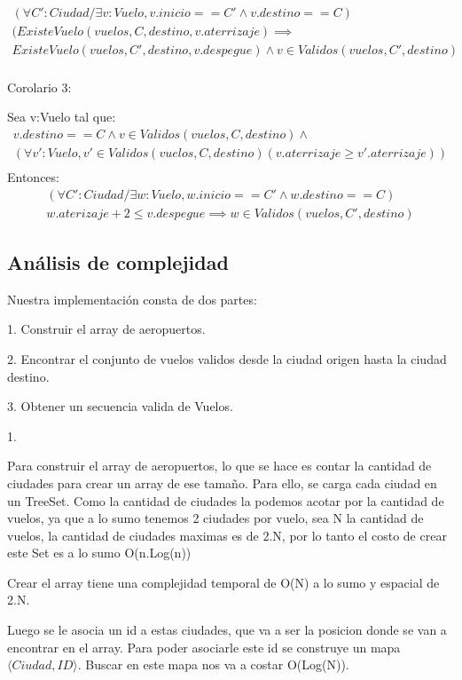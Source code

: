 \begin{align*}
(\forall C':Ciudad / \exists v:Vuelo, v.inicio == C' \wedge v.destino == C)\\
(ExisteVuelo(vuelos,C,destino,v.aterrizaje) \implies \\
ExisteVuelo(vuelos,C',destino,v.despegue) \wedge v \in Validos(vuelos,C',destino)
\end{align*}
\begin{align*}
\end{align*}


Corolario 3:

Sea v:Vuelo tal que:
\begin{align*}
v.destino == C \wedge v \in Validos(vuelos,C,destino) \wedge\\
(\forall v':Vuelo, v' \in Validos(vuelos,C,destino)(v.aterrizaje \geq v'.aterrizaje))\\
\end{align*}
Entonces:
\begin{align*}
(\forall C':Ciudad / \exists w:Vuelo, w.inicio == C' \wedge w.destino == C)\\
w.aterizaje + 2 \leq v.despegue \implies w \in Validos(vuelos,C',destino) 
\end{align*}


\newpage

\subsection{Análisis de complejidad}
Nuestra implementaci\'on consta de dos partes:

1. Construir el array de aeropuertos.

2. Encontrar el conjunto de vuelos validos desde la ciudad origen hasta la ciudad destino.

3. Obtener un secuencia valida de Vuelos.

1.

Para construir el array de aeropuertos, lo que se hace es contar la cantidad de ciudades para crear un array de ese tamaño.
Para ello, se carga cada ciudad en un TreeSet. Como la cantidad de ciudades la podemos acotar por la cantidad de vuelos, ya que a lo sumo tenemos 2 ciudades por vuelo, sea N la cantidad de vuelos, la cantidad de ciudades maximas es de 2.N, por lo tanto el costo de crear este Set es a lo sumo O(n.Log(n))

Crear el array tiene una complejidad temporal de O(N) a lo sumo y espacial de 2.N.

Luego se le asocia un id a estas ciudades, que va a ser la posicion donde se van a encontrar en el array. Para poder asociarle este id se construye un mapa $\langle Ciudad,ID \rangle$.
Buscar en este mapa nos va a costar O(Log(N)).

